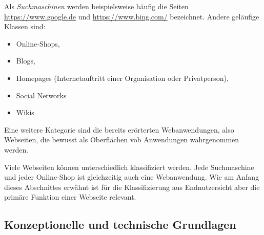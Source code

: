             Als \textit{Suchmaschinen} werden beispielsweise häufig die Seiten
            \url{https://www.google.de} und \url{https://www.bing.com/} bezeichnet.
            Andere geläufige Klassen sind:

            \begin{itemize}
                \item Online-Shops,
                \item Blogs,
                \item Homepages (Internetauftritt einer Organisation oder Privatperson),
                \item Social Networks
                \item Wikis
            \end{itemize}

            Eine weitere Kategorie sind die bereits erörterten Webanwendungen,
            also Webseiten, die bewusst als Oberflächen vob Anwendungen wahrgenommen werden.

            Viele Webseiten können unterschiedlich klassifiziert werden.
            Jede Suchmaschine und jeder Online-Shop ist gleichzeitig auch eine
            Webanwendung. Wie am Anfang dieses Abschnittes erwähnt ist für die
            Klassifizierung aus Endnutzersicht aber die primäre Funktion einer Webseite
            relevant.

        \subsection{Konzeptionelle und technische Grundlagen}